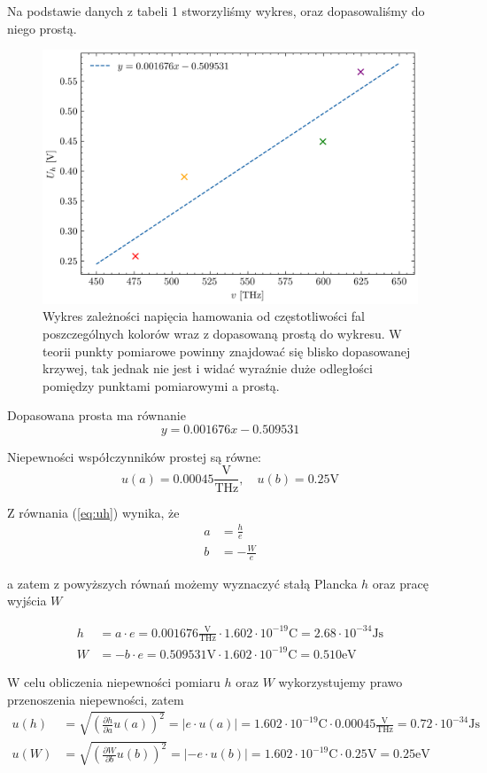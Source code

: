 \documentclass{fizykalab}
\newcommand{\vthz}{\ensuremath{\frac{\text{V}}{\text{THz}}}}
\newcommand{\volt}{\ensuremath{\text{V}}}
\newcommand{\Js}{\ensuremath{\text{Js}}}
\newcommand{\echarge}{\ensuremath{1.602 \cdot 10^{-19} \text{C}}}
\begin{document}
Na podstawie danych z tabeli 1 stworzyliśmy wykres,
oraz dopasowaliśmy do niego prostą.
\begin{figure}[H]
    \centering
    \includegraphics[width=0.75\linewidth]{allColorsFreq.png}
    \caption{Wykres zależności napięcia hamowania od częstotliwości fal poszczególnych kolorów 
    wraz z dopasowaną prostą do wykresu.
    W teorii punkty pomiarowe
    powinny znajdować się blisko dopasowanej krzywej,
    tak jednak nie jest i widać wyraźnie duże
    odległości pomiędzy punktami pomiarowymi a prostą. }
\end{figure}

Dopasowana prosta ma równanie
\begin{equation*}
    y = 0.001676x - 0.509531
\end{equation*}

Niepewności współczynników prostej są równe:
\begin{equation*}
    u(a) = 0.00045 \vthz, \quad u(b) = 0.25 \volt
\end{equation*}

Z równania (\ref{eq:uh}) wynika, że
\begin{align*}
    a &= \frac{h}{e}\\
    b &=  -\frac{W}{e}
\end{align*}

a zatem z powyższych równań możemy wyznaczyć stałą
Plancka $h$ oraz pracę wyjścia $W$

\begin{align*}
    h &= a \cdot e = 0.001676 \vthz \cdot \echarge
    = 2.68 \cdot 10^{-34} \Js \\
    W &=  -b \cdot e = 0.509531 \volt
    \cdot \echarge  = 0.510 \text{eV}
\end{align*}

W celu obliczenia niepewności pomiaru $h$ oraz $W$
wykorzystujemy prawo przenoszenia niepewności, zatem
\begin{align*}
    u(h) &= \sqrt{ \left( \frac{\partial h}{\partial a} u(a) \right)^2}  
    = \left|e \cdot u(a) \right| = \echarge \cdot 0.00045 \vthz =
    0.72 \cdot 10^{-34} \Js \\
    u(W) &= \sqrt{ \left( \frac{\partial W}{\partial b} u(b) \right)^2}  
    = \left|-e \cdot u(b) \right| = 
    \echarge \cdot 0.25 \volt = 0.25 \text{eV}
\end{align*}
\end{document}

